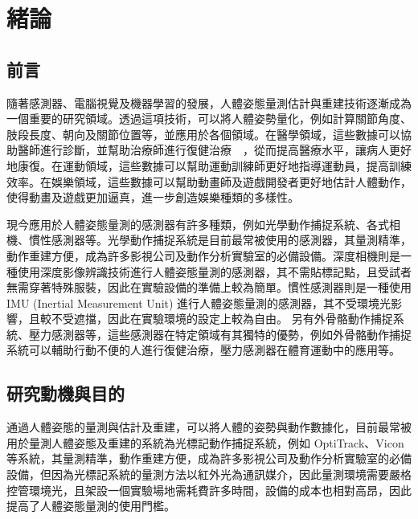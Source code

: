 \chapter{緒論}
\fontsize{12pt}{18pt}\selectfont

\section{前言}
隨著感測器、電腦視覺及機器學習的發展，人體姿態量測估計與重建技術逐漸成為一個重要的研究領域。透過這項技術，可以將人體姿勢量化，例如計算關節角度、肢段長度、朝向及關節位置等，並應用於各個領域。在醫學領域，這些數據可以協助醫師進行診斷，並幫助治療師進行復健治療~\cite{tsakanikas2020evaluating}~\cite{zhao2017imu}，從而提高醫療水平，讓病人更好地康復。在運動領域，這些數據可以幫助運動訓練師更好地指導運動員，提高訓練效率。在娛樂領域，這些數據可以幫助動畫師及遊戲開發者更好地估計人體動作，使得動畫及遊戲更加逼真，進一步創造娛樂種類的多樣性。

現今應用於人體姿態量測的感測器有許多種類，例如光學動作捕捉系統、各式相機、慣性感測器等。光學動作捕捉系統是目前最常被使用的感測器，其量測精準，動作重建方便，成為許多影視公司及動作分析實驗室的必備設備。深度相機則是一種使用深度影像辨識技術進行人體姿態量測的感測器，其不需貼標記點，且受試者無需穿著特殊服裝，因此在實驗設備的準備上較為簡單。慣性感測器則是一種使用 IMU (Inertial Measurement Unit) 進行人體姿態量測的感測器，其不受環境光影響，且較不受遮擋，因此在實驗環境的設定上較為自由。
另有外骨骼動作捕捉系統、壓力感測器等，這些感測器在特定領域有其獨特的優勢，例如外骨骼動作捕捉系統可以輔助行動不便的人進行復健治療，壓力感測器在體育運動中的應用等。

\section{研究動機與目的}
通過人體姿態的量測與估計及重建，可以將人體的姿勢與動作數據化，目前最常被用於量測人體姿態及重建的系統為光標記動作捕捉系統，例如 OptiTrack、Vicon 等系統，其量測精準，動作重建方便，成為許多影視公司及動作分析實驗室的必備設備，但因為光標記系統的量測方法以紅外光為通訊媒介，因此量測環境需要嚴格控管環境光，且架設一個實驗場地需耗費許多時間，設備的成本也相對高昂，因此提高了人體姿態量測的使用門檻。

